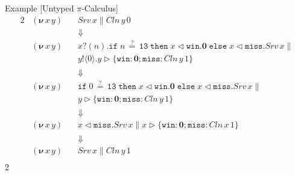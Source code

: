 \documentclass[dvipsnames]{beamer}
\newcommand{\Picalc}{$\pi$-Calculus}
\newcommand{\PO}{\textbf{0}}
\newcommand{\comp}[2]{#1 \parallel #2}
\newcommand{\new}[2]{(\boldsymbol{\nu} \, #1 \, #2) \,}
\newcommand{\send}[2]{#1 !\langle #2 \rangle .}
\newcommand{\recv}[2]{#1 ?( #2 ) .}
\newcommand{\branch}[3]{#1 \triangleright \{ #2 \}_{#3}}
\newcommand{\select}[2]{#1 \triangleleft #2 .}
\newcommand{\slidetitle}[2]{#2 \hspace*{\fill} [#1]}
\begin{document}
  \begin{frame}{\slidetitle{Untyped \Picalc{}}{Example}}
    \vspace{-1em}
    \begin{alignat*}{2}
      & \new{x}{y} && \comp{Srv \, x}{Cln \, y \, 0} \\
      & && \Downarrow \\
      & \new{x}{y} && \comp{\recv{x}{n} \mathtt{if} \; n \, \mathtt{\stackrel{?}{=}} \, \mathtt{13} \; \mathtt{then} \; \select{x}{\mathtt{win}} \PO \; \mathtt{else} \; \select{x}{\mathtt{miss}} Srv \, x}{\\
      & && \send{y}{0} \branch{y}{ \mathtt{win} : \PO; \mathtt{miss} : Cln \, y \, 1}{}} \\
      & && \Downarrow \\
      & \new{x}{y} && \comp{\mathtt{if} \; 0 \, \mathtt{\stackrel{?}{=}} \, \mathtt{13} \; \mathtt{then} \; \select{x}{\mathtt{win}} \PO \; \mathtt{else} \; \select{x}{\mathtt{miss}} Srv \, x}{\\
      & && \branch{y}{ \mathtt{win} : \PO; \mathtt{miss} : Cln \, y \, 1}{}} \\
      & && \Downarrow \\
      & \new{x}{y} && \comp{\select{x}{\mathtt{miss}} Srv \, x}{\branch{x}{ \mathtt{win} : \PO; \mathtt{miss} : Cln \, x \, 1}{}} \\
      & && \Downarrow \\
      & \new{x}{y} && \comp{Srv \, x}{Cln \, y \, 1} \\
    \end{alignat*}{2}
  \end{frame}
\end{document}
